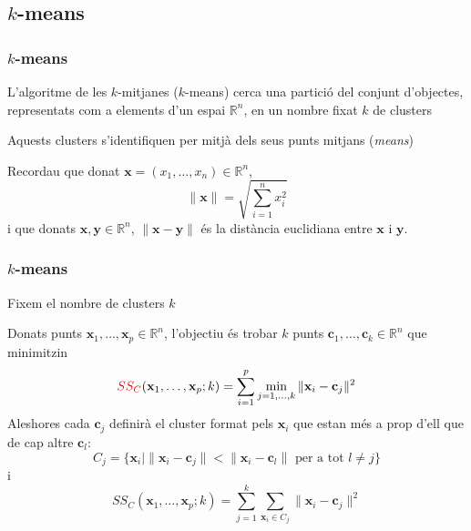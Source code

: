 \documentclass[12pt,t]{beamer}
\newcommand{\red}[1]{\textcolor{red}{#1}}
\renewcommand{\emph}[1]{{\color{red}#1}}
\newcommand{\RR}{\mathbb{R}}
\theoremstyle{plain}
\theoremstyle{definition}
\begin{document}
\subsection{$k$-means}

\begin{frame}
\frametitle{$k$-means}

L'algoritme de les $k$-mitjanes (\emph{$k$-means}) cerca una partició del conjunt d'objectes, representats com a elements d'un espai $\RR^n$, en un nombre fixat $k$ de clusters
\medskip

Aquests clusters s'identifiquen per mitjà dels seus punts mitjans (\textsl{means})\pause
\vspace*{0.8cm}

Recordau que donat $\mathbf{x}=(x_1,\ldots,x_n)\in \RR^n$,
$$
\|\mathbf{x}\|=\sqrt{\sum_{i=1}^n x_i^2}
$$
i que donats $\mathbf{x},\mathbf{y} \in \RR^n$, $\|\mathbf{x}-\mathbf{y}\|$ és la \emph{distància euclidiana} entre 
$\mathbf{x}$ i $\mathbf{y}$.
\end{frame}


\begin{frame}
\frametitle{$k$-means}
Fixem el nombre de clusters $k$
\medskip

Donats punts $\mathbf{x}_1,\ldots,\mathbf{x}_p\in \RR^n$, l'objectiu és trobar $k$ punts $\mathbf{c}_1,\ldots,\mathbf{c}_k\in \RR^n$ que minimitzin
$$
\red{SS_C}(\mathbf{x}_1,\ldots,\mathbf{x}_p; k)=\sum_{i=1}^p\min_{j=1,\ldots,k} \|\mathbf{x}_i-\mathbf{c}_j\|^2
$$
Aleshores cada $\mathbf{c}_j$ definirà el cluster format pels $\mathbf{x}_i$ que estan més a prop d'ell que de cap altre $\mathbf{c}_l$:
$$
C_j=\{\mathbf{x}_i\mid \|\mathbf{x}_i-\mathbf{c}_j\|<\|\mathbf{x}_i-\mathbf{c}_l\|\mbox{ per a tot }l\neq j\}
$$
i
$$
SS_C(\mathbf{x}_1,\ldots,\mathbf{x}_p; k)=\sum_{j=1}^k\sum_{\mathbf{x}_i\in C_j}  \|\mathbf{x}_i-\mathbf{c}_j\|^2
$$

\end{frame}
\end{document}
